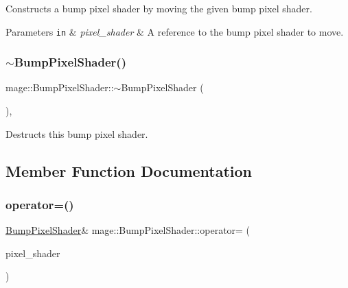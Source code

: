 Constructs a bump pixel shader by moving the given bump pixel shader.


\begin{DoxyParams}[1]{Parameters}
\mbox{\tt in}  & {\em pixel\+\_\+shader} & A reference to the bump pixel shader to move. \\
\hline
\end{DoxyParams}
\hypertarget{classmage_1_1_bump_pixel_shader_a73fde1c65d4e8e29795247a43a31926b}{}\label{classmage_1_1_bump_pixel_shader_a73fde1c65d4e8e29795247a43a31926b} 
\subsubsection{\texorpdfstring{$\sim$\+Bump\+Pixel\+Shader()}{~BumpPixelShader()}}
{\footnotesize\ttfamily mage\+::\+Bump\+Pixel\+Shader\+::$\sim$\+Bump\+Pixel\+Shader (\begin{DoxyParamCaption}{ }\end{DoxyParamCaption})\hspace{0.3cm}{\ttfamily [virtual]}, {\ttfamily [default]}}

Destructs this bump pixel shader. 

\subsection{Member Function Documentation}
\hypertarget{classmage_1_1_bump_pixel_shader_a9f9112ec617a7de6b6bd1272c8be42da}{}\label{classmage_1_1_bump_pixel_shader_a9f9112ec617a7de6b6bd1272c8be42da} 
\subsubsection{\texorpdfstring{operator=()}{operator=()}\hspace{0.1cm}{\footnotesize\ttfamily [1/2]}}
{\footnotesize\ttfamily \hyperlink{classmage_1_1_bump_pixel_shader}{Bump\+Pixel\+Shader}\& mage\+::\+Bump\+Pixel\+Shader\+::operator= (\begin{DoxyParamCaption}\item[{const \hyperlink{classmage_1_1_bump_pixel_shader}{Bump\+Pixel\+Shader} \&}]{pixel\+\_\+shader }\end{DoxyParamCaption})\hspace{0.3cm}{\ttfamily [delete]}}

